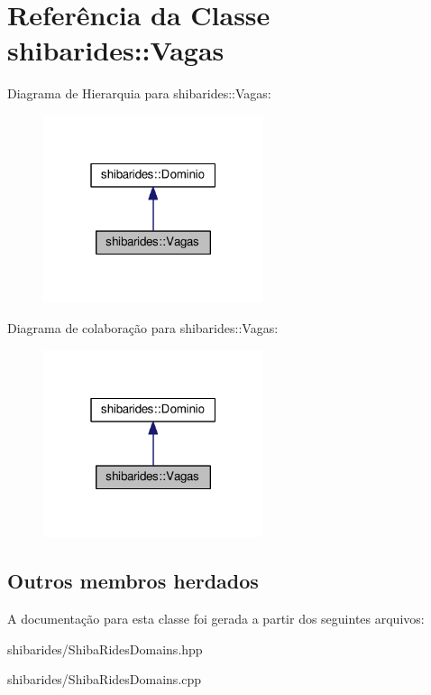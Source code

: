 \hypertarget{classshibarides_1_1Vagas}{}\section{Referência da Classe shibarides\+:\+:Vagas}
\label{classshibarides_1_1Vagas}


Diagrama de Hierarquia para shibarides\+:\+:Vagas\+:\nopagebreak
\begin{figure}[H]
\begin{center}
\leavevmode
\includegraphics[width=183pt]{classshibarides_1_1Vagas__inherit__graph}
\end{center}
\end{figure}


Diagrama de colaboração para shibarides\+:\+:Vagas\+:\nopagebreak
\begin{figure}[H]
\begin{center}
\leavevmode
\includegraphics[width=183pt]{classshibarides_1_1Vagas__coll__graph}
\end{center}
\end{figure}
\subsection*{Outros membros herdados}


A documentação para esta classe foi gerada a partir dos seguintes arquivos\+:\begin{DoxyCompactItemize}
\item 
shibarides/Shiba\+Rides\+Domains.\+hpp\item 
shibarides/Shiba\+Rides\+Domains.\+cpp\end{DoxyCompactItemize}
